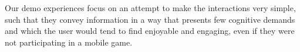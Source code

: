 \documentclass{chi-ext}
\begin{document}

Our demo experiences focus on an attempt to make the interactions very simple, such that they convey information in a way that presents few cognitive demands and which the user would tend to find enjoyable and engaging, even if they were not participating in a mobile game. 


\end{document}
